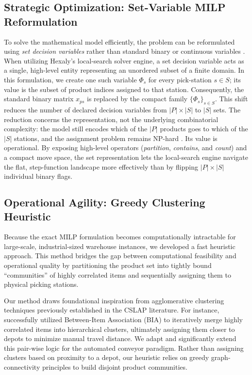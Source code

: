 \documentclass[preprint,review,11pt,authoryear]{elsarticle}
\begin{document}
\subsection{Strategic Optimization: Set-Variable MILP Reformulation}\label{sec:set_reformulation}
To solve the mathematical model efficiently, the problem can be reformulated using \emph{set decision variables} rather than standard binary or continuous variables \cite{blaisemodeling}. When utilizing Hexaly's local-search solver engine, a set decision variable acts as a single, high-level entity representing an unordered subset of a finite domain. In this formulation, we create one such variable \( \Phi_s \) for every pick-station $s \in S$; its value is the subset of product indices assigned to that station. Consequently, the standard binary matrix $x_{ps}$ is replaced by the compact family \( \{\Phi_s\}_{s \in S} \). This shift reduces the number of declared decision variables from $|P| \times |S|$ to $|S|$ sets. The reduction concerns the representation, not the underlying combinatorial complexity: the model still encodes which of the $|P|$ products goes to which of the $|S|$ stations, and the assignment problem remains NP-hard \cite{garey1979computers}. Its value is operational. By exposing high-level operators (\textit{partition}, \textit{contains}, and \textit{count}) and a compact move space, the set representation lets the local-search engine navigate the flat, step-function landscape more effectively than by flipping $|P|\times|S|$ individual binary flags.

\subsection{Operational Agility: Greedy Clustering Heuristic}
\label{sec:heuristic_clustering}

Because the exact MILP formulation becomes computationally intractable for large-scale, industrial-sized warehouse instances, we developed a fast heuristic approach. This method bridges the gap between computational feasibility and operational quality by partitioning the product set into tightly bound ``communities'' of highly correlated items and sequentially assigning them to physical picking stations.

Our method draws foundational inspiration from agglomerative clustering techniques previously established in the CSLAP literature. For instance, \cite{chuang2016} successfully utilized Between-Item Association (BIA) to iteratively merge highly correlated items into hierarchical clusters, ultimately assigning them closer to depots to minimize manual travel distance. We adapt and significantly extend this pair-wise logic for the automated conveyor paradigm. Rather than assigning clusters based on proximity to a depot, our heuristic relies on greedy graph-connectivity principles \cite{west2001introduction} to build disjoint product communities.
\end{document}

